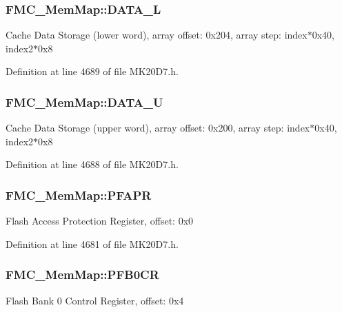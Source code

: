 \subsubsection[{\texorpdfstring{D\+A\+T\+A\+\_\+L}{DATA_L}}]{ F\+M\+C\+\_\+\+Mem\+Map\+::\+D\+A\+T\+A\+\_\+L}\hypertarget{struct_f_m_c___mem_map_a697bb0356541fe920260e33d29bf0698}{}\label{struct_f_m_c___mem_map_a697bb0356541fe920260e33d29bf0698}
Cache Data Storage (lower word), array offset\+: 0x204, array step\+: index$\ast$0x40, index2$\ast$0x8 

Definition at line 4689 of file M\+K20\+D7.\+h.

\subsubsection[{\texorpdfstring{D\+A\+T\+A\+\_\+U}{DATA_U}}]{ F\+M\+C\+\_\+\+Mem\+Map\+::\+D\+A\+T\+A\+\_\+U}\hypertarget{struct_f_m_c___mem_map_acd323327704230c8d13c021730d39c15}{}\label{struct_f_m_c___mem_map_acd323327704230c8d13c021730d39c15}
Cache Data Storage (upper word), array offset\+: 0x200, array step\+: index$\ast$0x40, index2$\ast$0x8 

Definition at line 4688 of file M\+K20\+D7.\+h.

\subsubsection[{\texorpdfstring{P\+F\+A\+PR}{PFAPR}}]{ F\+M\+C\+\_\+\+Mem\+Map\+::\+P\+F\+A\+PR}\hypertarget{struct_f_m_c___mem_map_a5b2a2d13262d7ed59ccc7b55e932797f}{}\label{struct_f_m_c___mem_map_a5b2a2d13262d7ed59ccc7b55e932797f}
Flash Access Protection Register, offset\+: 0x0 

Definition at line 4681 of file M\+K20\+D7.\+h.

\subsubsection[{\texorpdfstring{P\+F\+B0\+CR}{PFB0CR}}]{ F\+M\+C\+\_\+\+Mem\+Map\+::\+P\+F\+B0\+CR}\hypertarget{struct_f_m_c___mem_map_a71d841ed263f133591205a427cfbf341}{}\label{struct_f_m_c___mem_map_a71d841ed263f133591205a427cfbf341}
Flash Bank 0 Control Register, offset\+: 0x4 

